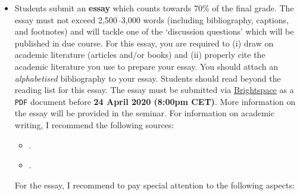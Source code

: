 \documentclass[abstract=on,parskip=full,headings=standardclasses,fontsize=11pt,paper=a4]{scrartcl}
\begin{document}
\begin{itemize}
\item Students submit an \textbf{essay}  which counts towards 70\% of the final grade. The essay must not exceed 2,500--3,000 words  (including bibliography, captions, and footnotes) and  will tackle one of the `discussion questions' which will be published in due course. For this essay, you are required to (i) draw on academic literature (articles and/or books) and (ii) properly cite the academic literature you use to prepare your essay. You should attach an \textit{alphabetised}  bibliography to your essay. Students should read beyond the reading list for this essay. The essay must be submitted via \href{https://brightspace.ucd.ie/d2l/home}{Brightspace} as a \texttt{PDF} document before \textbf{24 April 2020 (8:00pm CET)}. More information on the essay will be provided in the seminar. For information on academic writing, I recommend the following sources:

\begin{itemize}
\item {}.
\item {}.
\end{itemize}

For the essay, I recommend to pay special attention to the following aspects:


\end{itemize}
\end{document}
